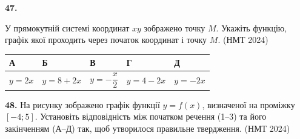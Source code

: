 \documentclass[14pt]{extarticle}
\newcommand{\answerTableTall}[5]{
\begin{center}
\begin{tabular}{|*{5}{>{\centering\arraybackslash}m{2.8cm}|}}
\hline
\rule[-0.3cm]{0pt}{0.8cm}\textbf{А} & \textbf{Б} & \textbf{В} & \textbf{Г} & \textbf{Д} \\
\hline
\rule[-0.9cm]{0pt}{2.0cm}#1 & 
\rule[-0.9cm]{0pt}{2.0cm}#2 & 
\rule[-0.9cm]{0pt}{2.0cm}#3 & 
\rule[-0.9cm]{0pt}{2.0cm}#4 & 
\rule[-0.9cm]{0pt}{2.0cm}#5 \\
\hline
\end{tabular}
\end{center}
}
\newcommand{\nmtyear}[1]{\hfill{\small\color{yearcolor}(НМТ #1)}}
\begin{document}
\noindent\textbf{47.} \begin{minipage}[t]{0.60\textwidth}
У прямокутній системі координат $xy$ зображено точку $M$. Укажіть функцію, графік якої проходить через початок координат і точку $M$. \nmtyear{2024}
\end{minipage}
\hfill
\begin{minipage}[t]{0.35\textwidth}
    \vspace{-0.5cm}
    \begin{flushright}
    \end{flushright}
\end{minipage}

\vspace{0.3cm}
\answerTableTall{$y = 2x$}{$y = 8 + 2x$}{$y = -\dfrac{x}{2}$}{$y = 4 - 2x$}{$y = -2x$}

\vspace{0.7cm}

\noindent\textbf{48.} На рисунку зображено графік функції $y=f(x)$, визначеної на проміжку $[-4; 5]$. Установіть відповідність між початком речення (1--3) та його закінченням (А--Д) так, щоб утворилося правильне твердження. \nmtyear{2024}

\vspace{0.3cm}
\end{document}
